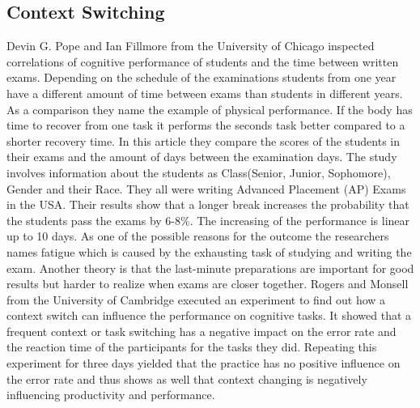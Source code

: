 \subsection{Context Switching}
Devin G. Pope and Ian Fillmore from the University of Chicago \cite{pope2015impact} inspected correlations of cognitive performance of students and the time between written exams. 
Depending on the schedule of the examinations students from one year have a different amount of time between exams than students in different years.
As a comparison they name the example of physical performance. If the body has time to recover from one task it performs the seconds task better compared to a shorter recovery time. In this article they compare the scores of the students in their exams and the amount of days between the examination days. 
The study involves information about the students as Class(Senior, Junior, Sophomore), Gender and their Race. They all were writing Advanced Placement (AP) Exams in the USA. 
Their results show that a longer break increases the probability that the students pass the exams by 6-8\%. The increasing of the performance is linear up to 10 days.
\bigbreak
As one of the possible reasons for the outcome the researchers names fatigue which is caused by the exhausting task of studying and writing the exam. Another theory is that the last-minute preparations are important for good results but harder to realize when exams are closer together. 
Rogers and Monsell from the University of Cambridge \cite{rogers1995costs} executed an experiment to find out how a context switch can influence the performance on cognitive tasks. It showed that a frequent context or task switching has a negative impact on the error rate and the reaction time of the participants for the tasks they did. Repeating this experiment for three days yielded that the practice has no positive influence on the error rate and thus shows as well that context changing is negatively influencing productivity and performance. 

